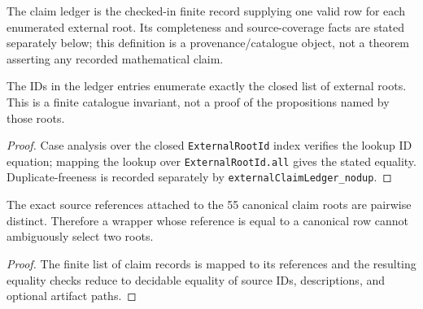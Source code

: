 \begin{definition}
  \label{def:external-claim-ledger}
  \leanok
  The claim ledger is the checked-in finite record supplying one valid row for
  each enumerated external root.  Its completeness and source-coverage facts
  are stated separately below; this definition is a provenance/catalogue
  object, not a theorem asserting any recorded mathematical claim.
\end{definition}

\begin{theorem}
  \label{thm:external-claim-ledger-complete}
  \leanok
  The IDs in the ledger entries enumerate exactly the closed list of external
  roots.  This is a finite catalogue invariant, not a proof of the propositions
  named by those roots.
\end{theorem}

\begin{proof}
  Case analysis over the closed \texttt{ExternalRootId} index verifies the lookup ID
  equation; mapping the lookup over \texttt{ExternalRootId.all} gives the stated
  equality.  Duplicate-freeness is recorded separately by
  \texttt{externalClaimLedger\_nodup}.
  \leanok
\end{proof}

\begin{theorem}
  \label{thm:external-claim-refs-unique}
  \leanok
  The exact source references attached to the 55 canonical claim roots are
  pairwise distinct.  Therefore a wrapper whose reference is equal to a
  canonical row cannot ambiguously select two roots.
\end{theorem}

\begin{proof}
  The finite list of claim records is mapped to its references and the
  resulting equality checks reduce to decidable equality of source IDs,
  descriptions, and optional artifact paths.
  \leanok
\end{proof}

